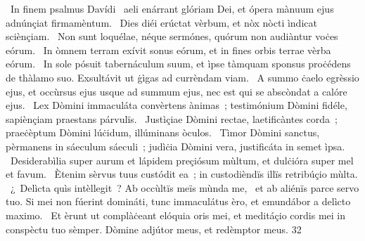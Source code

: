{~In finem psalmus Davídi}
{%
~aeli enárrant glóriam Dei, et ópera mànuum ejus adnúnçiat firmamèntum.
~Dies diéi erúctat vèrbum, et nòx nòcti ìndicat sciènçiam.
~Non sunt loquélae, néque sermónes, quórum non audiàntur voċes eórum.
~In òmnem terram exívit sonus eórum, et in fines orbis terrae vèrba eórum.
~In sole pósuit tabernáculum suum, et ìpse tàmquam sponsus proċédens de thàlamo suo. Exsultávit ut ġìgas ad currèndam viam.
~A summo ċaelo egrèssio ejus, et occùrsus ejus usque ad summum ejus, nec est qui se abscòndat a calóre ejus.
~Lex Dòmini immaculáta convèrtens ànimas~; testimónium Dòmini fidéle, sapiènçiam praestans párvulïs.
~Justìçiae Dòmini rectae, laetificàntes corda~; praeċèptum Dòmini lúċidum, illúminans òculos.
~Tìmor Dòmini sanctus, pèrmanens in sáeculum sáeculi~; judìċia Dòmini vera, justificáta in semet ìpsa.
~Desiderabìlia super aurum et lápidem preçiósum mùltum, et dulċióra super mel et favum.
~Ètenim sèrvus tuus custódit ea~; in custodièndïs illïs retribúçio mùlta.
~¿~Delìcta quìs intèllegit~? Ab occùltïs meïs mùnda me,
~et ab aliénïs parce servo tuo. Si mei non fúerint domináti, tunc immaculátus èro, et emundábor a delìcto maximo.
~Et èrunt ut complàċeant elóquia oris mei, et meditáçio cordis mei in conspèctu tuo sèmper. Dòmine adjútor meus, et redèmptor meus.
}
{3}{2}
